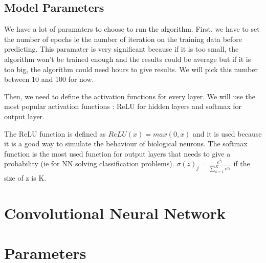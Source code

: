 \documentclass[12pt]{article}
\begin{document}
\subsection{Model Parameters}
We have a lot of paramaters to choose to run the algorithm.
First, we have to set the number of epochs ie the number of iteration on the training data before predicting. This paramater is very significant because if it is too small, the algorithm won't be trained enough and the results could be average but if it is too big, the algorithm could need hours to give results. We will pick this number between 10 and 100 for now.

Then, we need to define the activation functions for every layer. We will use the most popular activation functions : ReLU for hidden layers and softmax for output layer.

The ReLU function is defined as $ReLU(x) = max(0,x)$ and it is used because it is a good way to simulate the behaviour of biological neurons.
The softmax function is the most used function for output layers that needs to give a probability (ie for NN solving classification problems). $\sigma(z)_j = \frac{e^{z_j}}{\sum_{k=1}^{K} e^{z_k}}$ if the size of z is K.

\section{Convolutional Neural Network}

\section{Parameters}
\end{document}
